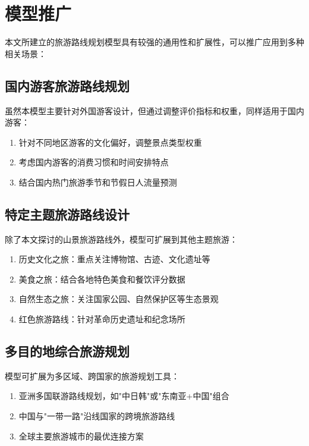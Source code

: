 \documentclass[withoutpreface,bwprint]{cumcmthesis} %
\begin{document}
\section{模型推广}

本文所建立的旅游路线规划模型具有较强的通用性和扩展性，可以推广应用到多种相关场景：

\subsection{国内游客旅游路线规划}
虽然本模型主要针对外国游客设计，但通过调整评价指标和权重，同样适用于国内游客：
\begin{enumerate}
    \item 针对不同地区游客的文化偏好，调整景点类型权重
    \item 考虑国内游客的消费习惯和时间安排特点
    \item 结合国内热门旅游季节和节假日人流量预测
\end{enumerate}

\subsection{特定主题旅游路线设计}
除了本文探讨的山景旅游路线外，模型可扩展到其他主题旅游：
\begin{enumerate}
    \item 历史文化之旅：重点关注博物馆、古迹、文化遗址等
    \item 美食之旅：结合各地特色美食和餐饮评分数据
    \item 自然生态之旅：关注国家公园、自然保护区等生态景观
    \item 红色旅游路线：针对革命历史遗址和纪念场所
\end{enumerate}

\subsection{多目的地综合旅游规划}
模型可扩展为多区域、跨国家的旅游规划工具：
\begin{enumerate}
    \item 亚洲多国联游路线规划，如"中日韩"或"东南亚+中国"组合
    \item 中国与"一带一路"沿线国家的跨境旅游路线
    \item 全球主要旅游城市的最优连接方案
\end{enumerate}
\end{document}
